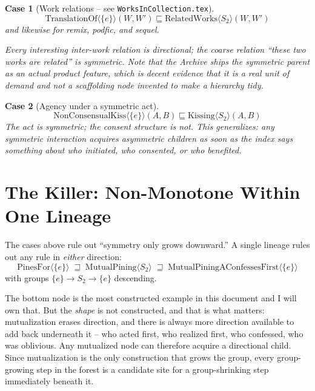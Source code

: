 \documentclass{amsart}
\newtheorem{tc}{Case}
\theoremstyle{remark}
\begin{document}
    \begin{tc}[Work relations -- see \texttt{WorksInCollection.tex}]
        \[
            \mathrm{TranslationOf}\langle\{e\}\rangle(W,W') \sqsubseteq \mathrm{RelatedWorks}\langle S_2\rangle(W,W')
        \]
        and likewise for remix, podfic, and sequel.

        Every interesting inter-work relation is directional; the coarse relation ``these two works are related'' is symmetric. Note that the Archive ships the symmetric parent as an actual product feature, which is decent evidence that it is a real unit of demand and not a scaffolding node invented to make a hierarchy tidy.
    \end{tc}

    \begin{tc}[Agency under a symmetric act]
        \[
            \mathrm{NonConsensualKiss}\langle\{e\}\rangle(A,B) \sqsubseteq \mathrm{Kissing}\langle S_2\rangle(A,B)
        \]
        The act is symmetric; the consent structure is not. This generalizes: any symmetric interaction acquires asymmetric children as soon as the index says something about who initiated, who consented, or who benefited.
    \end{tc}

    \section{The Killer: Non-Monotone Within One Lineage}
    The cases above rule out ``symmetry only grows downward.'' A single lineage rules out any rule in \emph{either} direction:
    \[
        \mathrm{PinesFor}\langle\{e\}\rangle \;\sqsupseteq\; \mathrm{MutualPining}\langle S_2\rangle \;\sqsupseteq\; \mathrm{MutualPiningAConfessesFirst}\langle\{e\}\rangle
    \]
    with groups $\{e\} \to S_2 \to \{e\}$ descending.

    The bottom node is the most constructed example in this document and I will own that. But the \emph{shape} is not constructed, and that is what matters: mutualization erases direction, and there is always more direction available to add back underneath it -- who acted first, who realized first, who confessed, who was oblivious. Any mutualized node can therefore acquire a directional child. Since mutualization is the only construction that grows the group, every group-growing step in the forest is a candidate site for a group-shrinking step immediately beneath it.
\end{document}
